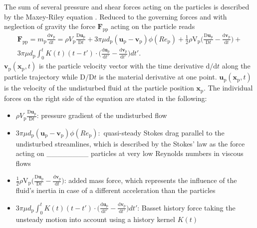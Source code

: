 \documentclass[11pt,a4paper,openany,oneside,parskip=half*]{article}
\renewcommand*\vec[1]{\boldsymbol{#1}}
\begin{document}
The sum of several pressure and shear forces acting on the particles is described by the Maxey-Riley equation \cite{EquationOfMotionForASmallRigidSphereInANonuniformFlow}.
Reduced to the governing forces and with neglection of gravity the force $\vec{F}_\mathrm{pp}$ acting on the particle reads
\begin{multline} \label{navier_stokes_particle}
 \vec{F}_\mathrm{pp} = m_\mathrm{p} \frac{\mathrm{d}\vec{v}_\mathrm{p}}{\mathrm{d}t} =\rho V_\mathrm{p}\frac{\mathrm{D}\vec{u}_\mathrm{p}}{\mathrm{D}t} + 3 \pi \mu d_\mathrm{p}(\vec{u}_\mathrm{p}-\vec{v}_\mathrm{p})\phi(Re_\mathrm{p})+ \frac{1}{2}\rho \mathrm{V}_\mathrm{p} \biggl(\frac{\mathrm{D}\vec{u}_\mathrm{p}}{\mathrm{D}t}-\frac{\mathrm{d}\vec{v}_\mathrm{p}}{\mathrm{d}t}\biggl) +
\\ 3 \pi \mu d_\mathrm{p}\int_{0}^{t} K(t) (t-t') \cdot \biggl(\frac{\mathrm{d}\vec{u}_\mathrm{p}}{\mathrm{d}t'}- \frac{\mathrm{d}\vec{v}_\mathrm{p}}{\mathrm{d}t'}\biggl)dt'.
\end{multline}
$\vec{v}_\mathrm{p}(\vec{x}_\mathrm{p},t)$ is the particle velocity vector with the time derivative $\mathrm{d}/\mathrm{d}t$ along the particle trajectory while $\mathrm{D}/\mathrm{D}t$  is the material derivative at one point. $\vec{u}_\mathrm{p}(\vec{x}_\mathrm{p},t)$ is the velocity of the undisturbed fluid at the particle position $\vec{x}_\mathrm{p}$.
The individual forces on the right side of the equation are stated in the following:
\begin{itemize} 
\item  $\rho V_\mathrm{p}\frac{\mathrm{D}\vec{u}_\mathrm{p}}{\mathrm{D}t}$: \newline
pressure gradient of the undisturbed flow
\item $3 \pi \mu d_\mathrm{p}(\vec{u}_\mathrm{p}-\vec{v}_\mathrm{p})\phi(Re_\mathrm{p}):$\newline
quasi-steady Stokes drag parallel to the undisturbed streamlines, which is described by the Stokes' law as the force acting on ________ particles at very low Reynolds numbers in viscous flows

\item $\frac{1}{2}\rho \mathrm{V}_\mathrm{p} \biggl(\frac{\mathrm{D}\vec{u}_\mathrm{p}}{\mathrm{D}t}-\frac{\mathrm{d}\vec{v}_\mathrm{p}}{\mathrm{d}t}\biggl)$:
\newline
added mass force, which represents the influence of the fluid's inertia in case of a different acceleration than the particles
\item $3 \pi \mu d_\mathrm{p}\int_{0}^{t} K(t) (t-t') \cdot \biggl(\frac{\mathrm{d}\vec{u}_\mathrm{p}}{\mathrm{d}t'}- \frac{\mathrm{d}\vec{v}_\mathrm{p}}{\mathrm{d}t'}\biggl)dt'$: \newline
Basset history force taking the unsteady motion into account using a history kernel $K(t)$ 
\end{itemize}
\end{document}
